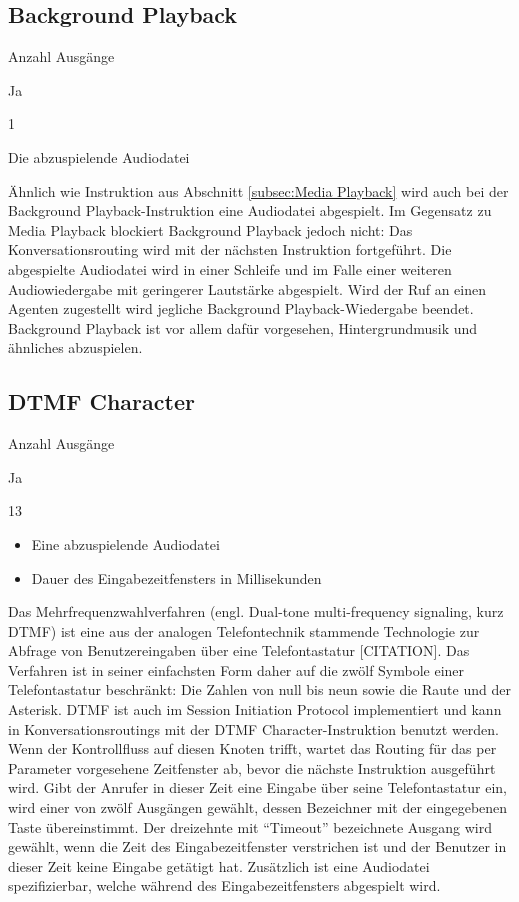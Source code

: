 \subsection{Background Playback}
\begin{labeling}{Anzahl Ausgänge}
\item [Eingang] Ja
\item [Anzahl Ausgänge] 1
\item [Parameter] Die abzuspielende Audiodatei
\item [Beschreibung] Ähnlich wie Instruktion aus Abschnitt \ref{subsec:Media Playback} wird auch bei der Background Playback-Instruktion eine Audiodatei abgespielt. Im Gegensatz zu Media Playback blockiert Background Playback jedoch nicht: Das Konversationsrouting wird mit der nächsten Instruktion fortgeführt. Die abgespielte Audiodatei wird in einer Schleife und im Falle einer weiteren Audiowiedergabe mit geringerer Lautstärke abgespielt. Wird der Ruf an einen Agenten zugestellt wird jegliche Background Playback-Wiedergabe beendet. Background Playback ist vor allem dafür vorgesehen, Hintergrundmusik und ähnliches abzuspielen.
\end{labeling}

\subsection{DTMF Character}
\begin{labeling}{Anzahl Ausgänge}
\item [Eingang] Ja
\item [Anzahl Ausgänge] 13
\item [Parameter] \begin{itemize} \item Eine abzuspielende Audiodatei  \item Dauer des Eingabezeitfensters in Millisekunden \end{itemize}
\item [Beschreibung] Das Mehrfrequenzwahlverfahren (engl. Dual-tone multi-frequency signaling, kurz DTMF) ist eine aus der analogen Telefontechnik stammende Technologie zur Abfrage von Benutzereingaben über eine Telefontastatur [CITATION]. Das Verfahren ist in seiner einfachsten Form daher auf die zwölf Symbole einer Telefontastatur beschränkt: Die Zahlen von null bis neun sowie die Raute und der Asterisk. DTMF ist auch im Session Initiation Protocol implementiert und kann in Konversationsroutings mit der DTMF Character-Instruktion benutzt werden. Wenn der Kontrollfluss auf diesen Knoten trifft, wartet das Routing für das per Parameter vorgesehene Zeitfenster ab, bevor die nächste Instruktion ausgeführt wird. Gibt der Anrufer in dieser Zeit eine Eingabe über seine Telefontastatur ein, wird einer von zwölf Ausgängen gewählt, dessen Bezeichner mit der eingegebenen Taste übereinstimmt. Der dreizehnte mit ``Timeout'' bezeichnete Ausgang wird gewählt, wenn die Zeit des Eingabezeitfenster verstrichen ist und der Benutzer in dieser Zeit keine Eingabe getätigt hat. Zusätzlich ist eine Audiodatei spezifizierbar, welche während des Eingabezeitfensters abgespielt wird.  
\end{labeling}


